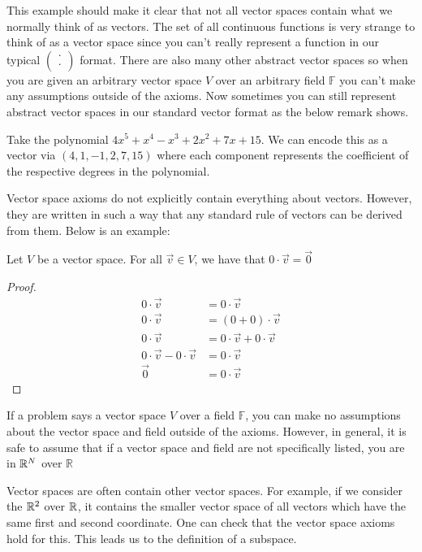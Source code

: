 This example should make it clear that not all vector spaces contain what we normally think of as vectors. The set of all continuous functions is very strange to think of as a vector space since you can't really represent a function in our typical $\begin{pmatrix}
    \cdot \\ \cdot
\end{pmatrix}$ format. There are also many other abstract vector spaces so when you are given an arbitrary vector space $V$ over an arbitrary field $\mathbb{F}$ you can't make any assumptions outside of the axioms. Now sometimes you can still represent abstract vector spaces in our standard vector format as the below remark shows.
\begin{remark}
    Take the polynomial $4x^5+x^4-x^3+2x^2+7x+15$. We can encode this as a vector via $(4, 1, -1, 2, 7, 15)$ where each component represents the coefficient of the respective degrees in the polynomial.
\end{remark}
Vector space axioms do not explicitly contain everything about vectors. However, they are written in such a way that any standard rule of vectors can be derived from them. Below is an example:
\begin{theorem}
    Let $V$ be a vector space. For all $\vec{v}\in V$, we have that $0\cdot\vec{v}=\vec{0}$
\end{theorem}
\begin{proof}
    \begin{align*}
        0\cdot\vec{v}&=0\cdot\vec{v}\\
        0\cdot\vec{v}&=(0+0)\cdot\vec{v}\tag{from Additive Identity}\\
        0\cdot\vec{v}&=0\cdot\vec{v}+0\cdot\vec{v}\tag{from Vector Over Scalar Distributivity}\\
        0\cdot\vec{v}-0\cdot\vec{v}&=0\cdot\vec{v}\\
        \vec{0}&=0\cdot\vec{v}\tag{from Additive Inverse}
    \end{align*}
\end{proof}
\begin{remark}
    If a problem says a vector space $V$ over a field $\mathbb{F}$, you can make no assumptions about the vector space and field outside of the axioms. However, in general, it is safe to assume that if a vector space and field are not specifically listed, you are in $\mathbb{R}^N$ over $\mathbb{R}$
\end{remark}
Vector spaces are often contain other vector spaces. For example, if we consider the $\mathbb{R}^2$ over $\mathbb{R}$, it contains the smaller vector space of all vectors which have the same first and second coordinate. One can check that the vector space axioms hold for this. This leads us to the definition of a subspace.
